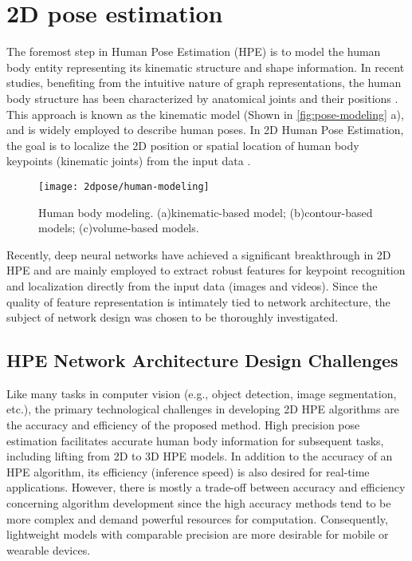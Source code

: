 \section{2D pose estimation}
The foremost step in Human Pose Estimation (HPE) is to model the human body entity representing its kinematic structure and shape information. In recent studies, benefiting from the intuitive nature of graph representations, the human body structure has been characterized by anatomical joints and their positions \cite{zuffi_pictorial_2012}. This approach is known as the kinematic model (Shown in \autoref{fig:pose-modeling} a), and is widely employed to describe human poses. In 2D Human Pose Estimation, the goal is to localize the 2D position or spatial location of human body keypoints (kinematic joints) from the input data \cite{rafi_efficient_2016}.

\begin{figure*}[!htb]
	\centering
	\texttt{[image: 2dpose/human-modeling]}
	\caption{Human body modeling. (a)kinematic-based model; (b)contour-based models; (c)volume-based models. 
	\cite{chen_monocular_2020}}
	\label{fig:pose-modeling}
\end{figure*}

Recently, deep neural networks have achieved a significant breakthrough in 2D HPE and are mainly employed to extract robust features for keypoint recognition and localization directly from the input data (images and videos). Since the quality of feature representation is intimately tied to network architecture, the subject of network design was chosen to be thoroughly investigated. 

\subsection*{HPE Network Architecture Design Challenges}

Like many tasks in computer vision (e.g., object detection, image segmentation, etc.), the primary technological challenges in developing 2D HPE algorithms are the accuracy and efficiency of the proposed method. High precision pose estimation facilitates accurate human body information for subsequent tasks, including lifting from 2D to 3D HPE models. In addition to the accuracy of an HPE algorithm, its efficiency (inference speed) is also desired for real-time applications. However, there is mostly a trade-off between accuracy and efficiency concerning algorithm development since the high accuracy methods tend to be more complex and demand powerful resources for computation. Consequently, lightweight models with comparable precision are more desirable for mobile or wearable devices. 

